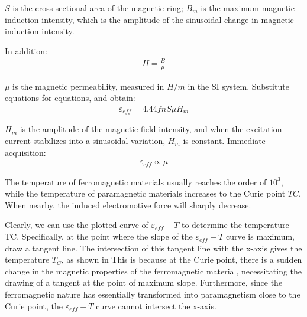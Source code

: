 \documentclass[UTF8]{article}
\begin{document}
      $S$ is the cross-sectional area of the magnetic ring; $B_m$ is the maximum magnetic induction intensity, which is the amplitude of the sinusoidal change in magnetic induction intensity.
      
      In addition:
      \begin{eqnarray}
      H = \frac{B}{\mu}
      \end{eqnarray}
      
      $\mu$ is the magnetic permeability, measured in $H/m$ in the SI system. Substitute equations for equations, and obtain:
      \begin{eqnarray}
      \varepsilon_{eff} = 4.44 fn S\mu H_m
      \end{eqnarray}
       
      $H_m$ is the amplitude of the magnetic field intensity, and when the excitation current stabilizes into a sinusoidal variation, $H_m$ is constant. Immediate acquisition:
      \begin{eqnarray}
      \varepsilon_{eff} \propto \mu
      \end{eqnarray}
       
       The temperature of ferromagnetic materials usually reaches the order of $10^3$, while the temperature of paramagnetic materials increases to the Curie point $TC$. When nearby, the induced electromotive force will sharply decrease.
       
       Clearly, we can use the plotted curve of $\varepsilon_{eff}-T$ to determine the temperature TC. Specifically, at the point where the slope of the $\varepsilon_{eff}−T$ curve is maximum, draw a tangent line. The intersection of this tangent line with the x-axis gives the temperature $T_C$, as shown in This is because at the Curie point, there is a sudden change in the magnetic properties of the ferromagnetic material, necessitating the drawing of a tangent at the point of maximum slope. Furthermore, since the ferromagnetic nature has essentially transformed into paramagnetism close to the Curie point, the $\varepsilon_{eff}−T$ curve cannot intersect the x-axis.
       
\end{document}
